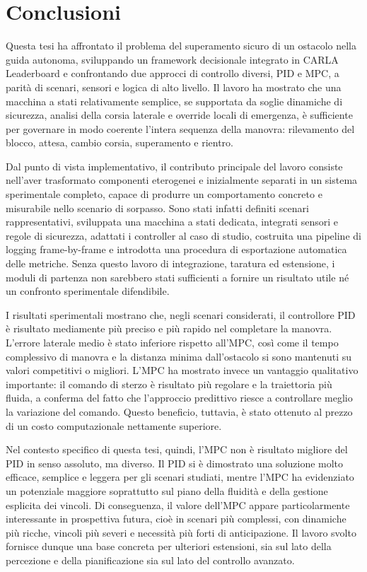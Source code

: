 \chapter{Conclusioni}

Questa tesi ha affrontato il problema del superamento sicuro di un ostacolo nella guida autonoma, sviluppando un framework decisionale integrato in CARLA Leaderboard e confrontando due approcci di controllo diversi, PID e MPC, a parità di scenari, sensori e logica di alto livello. Il lavoro ha mostrato che una macchina a stati relativamente semplice, se supportata da soglie dinamiche di sicurezza, analisi della corsia laterale e override locali di emergenza, è sufficiente per governare in modo coerente l'intera sequenza della manovra: rilevamento del blocco, attesa, cambio corsia, superamento e rientro.

Dal punto di vista implementativo, il contributo principale del lavoro consiste nell'aver trasformato componenti eterogenei e inizialmente separati in un sistema sperimentale completo, capace di produrre un comportamento concreto e misurabile nello scenario di sorpasso. Sono stati infatti definiti scenari rappresentativi, sviluppata una macchina a stati dedicata, integrati sensori e regole di sicurezza, adattati i controller al caso di studio, costruita una pipeline di logging frame-by-frame e introdotta una procedura di esportazione automatica delle metriche. Senza questo lavoro di integrazione, taratura ed estensione, i moduli di partenza non sarebbero stati sufficienti a fornire un risultato utile né un confronto sperimentale difendibile.

I risultati sperimentali mostrano che, negli scenari considerati, il controllore PID è risultato mediamente più preciso e più rapido nel completare la manovra. L'errore laterale medio è stato inferiore rispetto all'MPC, così come il tempo complessivo di manovra e la distanza minima dall'ostacolo si sono mantenuti su valori competitivi o migliori. L'MPC ha mostrato invece un vantaggio qualitativo importante: il comando di sterzo è risultato più regolare e la traiettoria più fluida, a conferma del fatto che l'approccio predittivo riesce a controllare meglio la variazione del comando. Questo beneficio, tuttavia, è stato ottenuto al prezzo di un costo computazionale nettamente superiore.

Nel contesto specifico di questa tesi, quindi, l'MPC non è risultato migliore del PID in senso assoluto, ma diverso. Il PID si è dimostrato una soluzione molto efficace, semplice e leggera per gli scenari studiati, mentre l'MPC ha evidenziato un potenziale maggiore soprattutto sul piano della fluidità e della gestione esplicita dei vincoli. Di conseguenza, il valore dell'MPC appare particolarmente interessante in prospettiva futura, cioè in scenari più complessi, con dinamiche più ricche, vincoli più severi e necessità più forti di anticipazione. Il lavoro svolto fornisce dunque una base concreta per ulteriori estensioni, sia sul lato della percezione e della pianificazione sia sul lato del controllo avanzato.
